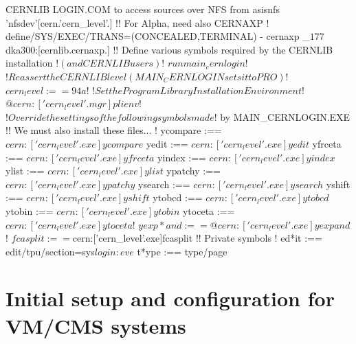\begin{XMPt}{CERNLIB LOGIN.COM to access sources over NFS from asisnfs}
     'nfsdev'[cern.'cern_level'.]
$!
$! For Alpha, need also CERNAXP
$!
$ define/SYS/EXEC/TRANS=(CONCEALED,TERMINAL) -
     cernaxp _$177$dka300:[cernlib.cernaxp.]
$!
$! Define various symbols required by the CERNLIB installation
$! (and CERNLIB users)
$!
$ run main_cernlogin
$!
$! Reassert the CERNLIB level (MAIN_CERNLOGIN sets it to PRO)
$!
$ cern_level :== 94a
$!
$! Set the Program Library Installation Environment
$!
$ @cern:['cern_level'.mgr]plienv
$!
$! Override the settings of the following symbols made
$! by MAIN_CERNLOGIN.EXE
$! 
$! We must also install these files...
$!
$ ycompare   :== $cern:['cern_level'.exe]ycompare
$ yedit      :== $cern:['cern_level'.exe]yedit
$ yfrceta    :== $cern:['cern_level'.exe]yfrceta
$ yindex     :== $cern:['cern_level'.exe]yindex
$ ylist      :== $cern:['cern_level'.exe]ylist
$ ypatchy    :== $cern:['cern_level'.exe]ypatchy
$ ysearch    :== $cern:['cern_level'.exe]ysearch
$ yshift     :== $cern:['cern_level'.exe]yshift
$ ytobcd     :== $cern:['cern_level'.exe]ytobcd
$ ytobin     :== $cern:['cern_level'.exe]ytobin
$ ytoceta    :== $cern:['cern_level'.exe]ytoceta
$!
$ yexp*and   :== @cern:['cern_level'.exe]yexpand
$!
$ fcasplit   :== $cern:['cern_level'.exe]fcasplit
$!
$! Private symbols
$!
$ ed*it      :== edit/tpu/section=sys$login:eve
$ t*ype      :== type/page
\end{XMPt}

\chapter{Initial setup and configuration for VM/CMS systems}

